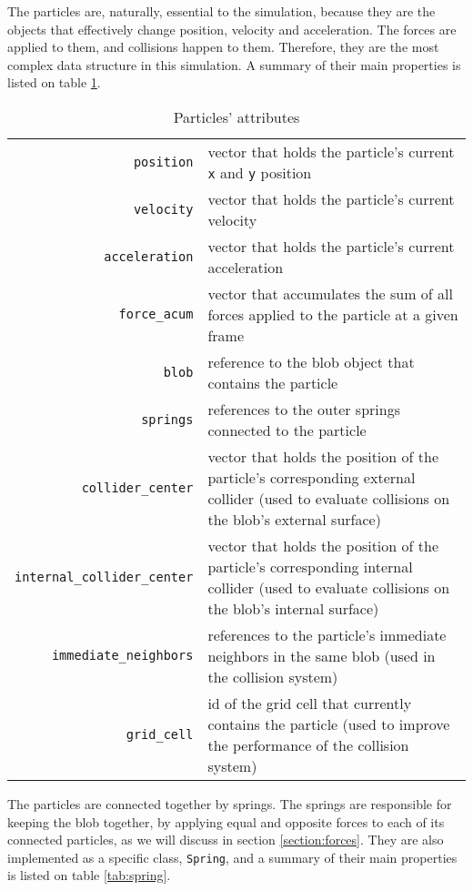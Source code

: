 \documentclass[manuscript, screen]{timtm}
\begin{document}
The particles are, naturally, essential to the simulation, because they are the objects that effectively change position, velocity and acceleration. The forces are applied to them, and collisions happen to them. Therefore, they are the most complex data structure in this simulation. A summary of their main properties is listed on table \ref{tab:particle}.

\begin{table}
  \caption{Particles' attributes}
  \label{tab:particle}
  \begin{tabularx}{\textwidth}{rX}
    \toprule
    \texttt{position} & vector that holds the particle's current \texttt{x} and \texttt{y} position\\
    \texttt{velocity} & vector that holds the particle's current velocity\\
    \texttt{acceleration} & vector that holds the particle's current acceleration\\
    \texttt{force\_acum} & vector that accumulates the sum of all forces applied to the particle at a given frame\\
    \texttt{blob} & reference to the blob object that contains the particle\\
    \texttt{springs} & references to the outer springs connected to the particle\\
    \texttt{collider\_center} & vector that holds the position of the particle's corresponding external collider (used to evaluate collisions on the blob's external surface)\\
    \texttt{internal\_collider\_center} & vector that holds the position of the particle's corresponding internal collider (used to evaluate collisions on the blob's internal surface)\\
    \texttt{immediate\_neighbors} & references to the particle's immediate neighbors in the same blob (used in the collision system)\\
    \texttt{grid\_cell} & id of the grid cell that currently contains the particle (used to improve the performance of the collision system)\\
    \bottomrule
    \end{tabularx}
\end{table}

The particles are connected together by springs. The springs are responsible for keeping the blob together, by applying equal and opposite forces to each of its connected particles, as we will discuss in section \ref{section:forces}. They are also implemented as a specific class, \texttt{Spring}, and a summary of their main properties is listed on table \ref{tab:spring}.
\end{document}
